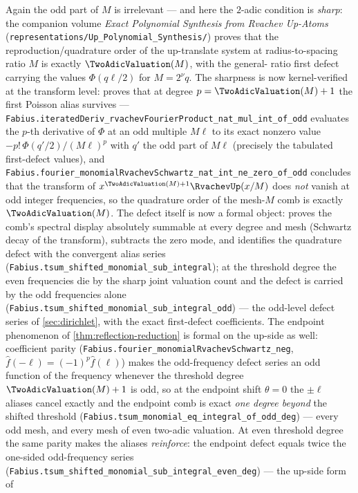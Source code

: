 \documentclass[11pt,oneside]{article}
\numberwithin{equation}{section}
\theoremstyle{definition}
\theoremstyle{remark}
\begin{document}
Again the odd part of $M$ is irrelevant --- and here the $2$-adic
condition is \emph{sharp}: the companion volume \emph{Exact Polynomial
Synthesis from Rvachev Up-Atoms}
(\nolinkurl{representations/Up_Polynomial_Synthesis/}) proves that the
reproduction/quadrature order of the up-translate system at
radius-to-spacing ratio $M$ is exactly $\TwoAdicValuation(M)$, with the general-%
ratio first defect carrying the values $\Phi(q\ell/2)$ for $M=2^{\nu}q$.  The
sharpness is now kernel-verified at the transform level: 
proves that at degree $p=\TwoAdicValuation(M)+1$ the first Poisson alias survives ---
\nolinkurl{Fabius.iteratedDeriv_rvachevFourierProduct_nat_mul_int_of_odd} evaluates the
$p$-th derivative of $\Phi$ at an odd multiple $M\ell$ to its exact nonzero value
$-p!\,\Phi(q'/2)/(M\ell)^p$ with $q'$ the odd part of $M\ell$ (precisely the tabulated
first-defect values), and
\nolinkurl{Fabius.fourier_monomialRvachevSchwartz_nat_int_ne_zero_of_odd} concludes that
the transform of $x^{\TwoAdicValuation(M)+1}\RvachevUp(x/M)$ does \emph{not} vanish at odd integer
frequencies, so the quadrature order of the mesh-$M$ comb is exactly $\TwoAdicValuation(M)$.
The defect itself is now a formal object:  proves the comb's
spectral display absolutely summable at every degree and mesh (Schwartz decay of the
transform), subtracts the zero mode, and identifies the quadrature defect with the
convergent alias series
(\nolinkurl{Fabius.tsum_shifted_monomial_sub_integral}); at the threshold degree the even
frequencies die by the sharp joint valuation count and the defect is carried by the
odd frequencies alone (\nolinkurl{Fabius.tsum_shifted_monomial_sub_integral_odd}) --- the
odd-level defect series of \cref{sec:dirichlet}, with the exact first-defect
coefficients.  The endpoint phenomenon of \cref{thm:reflection-reduction} is formal on
the up-side as well: coefficient parity
(\nolinkurl{Fabius.fourier_monomialRvachevSchwartz_neg}, $\hat f(-\ell)=(-1)^p\hat f(\ell)$)
makes the odd-frequency defect series an odd function of the frequency whenever the
threshold degree $\TwoAdicValuation(M)+1$ is odd, so at the endpoint shift $\theta=0$ the
$\pm\ell$ aliases cancel exactly and the endpoint comb is exact \emph{one degree
beyond} the shifted threshold
(\nolinkurl{Fabius.tsum_monomial_eq_integral_of_odd_deg}) --- every odd mesh, and every
mesh of even two-adic valuation.  At even threshold degree the same parity makes the
aliases \emph{reinforce}: the endpoint defect equals twice the one-sided odd-frequency
series
(\nolinkurl{Fabius.tsum_shifted_monomial_sub_integral_even_deg}) --- the up-side form of
\end{document}
